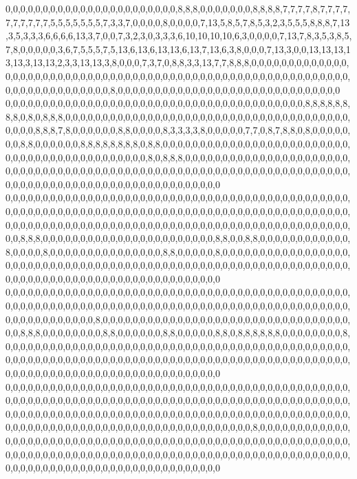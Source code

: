 0,0,0,0,0,0,0,0,0,0,0,0,0,0,0,0,0,0,0,0,0,0,0,8,8,8,0,0,0,0,0,0,0,8,8,8,8,7,7,7,7,8,7,7,7,7,7,7,7,7,7,7,5,5,5,5,5,5,5,7,3,3,7,0,0,0,0,8,0,0,0,0,7,13,5,8,5,7,8,5,3,2,3,5,5,5,8,8,8,7,13,3,5,3,3,3,6,6,6,6,13,3,7,0,0,7,3,2,3,0,3,3,3,6,10,10,10,10,6,3,0,0,0,0,7,13,7,8,3,5,3,8,5,7,8,0,0,0,0,0,3,6,7,5,5,5,7,5,13,6,13,6,13,13,6,13,7,13,6,3,8,0,0,0,7,13,3,0,0,13,13,13,13,13,3,13,13,2,3,3,13,13,3,8,0,0,0,7,3,7,0,8,8,3,3,13,7,7,8,8,8,0,0,0,0,0,0,0,0,0,0,0,0,0,0,0,0,0,0,0,0,0,0,0,0,0,0,0,0,0,0,0,0,0,0,0,0,0,0,0,0,0,0,0,0,0,0,0,0,0,0,0,0,0,0,0,0,0,0,0,0,0,0,0,0,0,0,0,0,0,0,0,0,0,8,0,0,0,0,0,0,0,0,0,0,0,0,0,0,0,0,0,0,0,0,0,0,0,0,0,0,0,0,0,0
0,0,0,0,0,0,0,0,0,0,0,0,0,0,0,0,0,0,0,0,0,0,0,0,0,0,0,0,0,0,0,0,0,0,0,0,0,0,0,0,8,8,8,8,8,8,8,8,0,8,0,8,8,8,0,0,0,0,0,0,0,0,0,0,0,0,0,0,0,0,0,0,0,0,0,0,0,0,0,0,0,0,0,0,0,0,0,0,0,0,0,0,0,0,0,0,8,8,8,7,8,0,0,0,0,0,0,8,8,0,0,0,0,8,3,3,3,3,8,0,0,0,0,0,7,7,0,8,7,8,8,0,8,0,0,0,0,0,0,0,8,8,0,0,0,0,0,0,8,8,8,8,8,8,8,8,0,8,8,0,0,0,0,0,0,0,0,0,0,0,0,0,0,0,0,0,0,0,0,0,0,0,0,0,0,0,0,0,0,0,0,0,0,0,0,0,0,0,0,0,0,0,0,8,0,8,8,8,0,0,0,0,0,0,0,0,0,0,0,0,0,0,0,0,0,0,0,0,0,0,0,0,0,0,0,0,0,0,0,0,0,0,0,0,0,0,0,0,0,0,0,0,0,0,0,0,0,0,0,0,0,0,0,0,0,0,0,0,0,0,0,0,0,0,0,0,0,0,0,0,0,0,0,0,0,0,0,0,0,0,0,0,0,0,0,0,0,0,0,0,0,0,0,0,0
0,0,0,0,0,0,0,0,0,0,0,0,0,0,0,0,0,0,0,0,0,0,0,0,0,0,0,0,0,0,0,0,0,0,0,0,0,0,0,0,0,0,0,0,0,0,0,0,0,0,0,0,0,0,0,0,0,0,0,0,0,0,0,0,0,0,0,0,0,0,0,0,0,0,0,0,0,0,0,0,0,0,0,0,0,0,0,0,0,0,0,0,0,0,0,0,0,0,0,0,0,0,0,0,0,0,0,0,0,0,0,0,0,0,0,0,0,0,0,0,0,0,0,0,0,0,0,0,0,0,0,0,0,0,0,0,0,0,0,0,8,8,8,0,0,0,0,0,0,0,0,0,0,0,0,0,0,0,0,0,0,0,0,0,0,0,8,8,0,0,8,8,0,0,0,0,0,0,0,0,0,0,0,0,8,0,0,0,0,8,0,0,0,0,0,0,0,0,0,0,0,0,0,0,0,8,8,0,0,0,0,0,8,0,0,0,0,0,0,0,0,0,0,0,0,0,0,0,0,0,0,0,0,0,0,0,0,0,0,0,0,0,0,0,0,0,0,0,0,0,0,0,0,0,0,0,0,0,0,0,0,0,0,0,0,0,0,0,0,0,0,0,0,0,0,0,0,0,0,0,0,0,0,0,0,0,0,0,0,0,0,0,0,0,0,0,0,0,0,0,0,0,0,0,0
0,0,0,0,0,0,0,0,0,0,0,0,0,0,0,0,0,0,0,0,0,0,0,0,0,0,0,0,0,0,0,0,0,0,0,0,0,0,0,0,0,0,0,0,0,0,0,0,0,0,0,0,0,0,0,0,0,0,0,0,0,0,0,0,0,0,0,0,0,0,0,0,0,0,0,0,0,0,0,0,0,0,0,0,0,0,0,0,0,0,0,0,0,0,0,0,0,0,0,0,0,0,0,0,8,0,0,0,0,0,0,0,0,0,0,0,0,0,0,0,0,0,0,0,0,0,0,0,0,0,0,0,0,0,0,0,0,0,0,0,8,8,8,0,0,0,0,0,0,0,0,8,8,0,0,0,0,0,0,8,8,0,0,0,0,0,8,8,0,8,8,8,8,8,8,0,0,0,0,0,0,0,0,8,0,0,0,0,0,0,0,0,0,0,0,0,0,0,0,0,0,0,0,0,0,0,0,0,0,0,0,0,0,0,0,0,0,0,0,0,0,0,0,0,0,0,0,0,0,0,0,0,0,0,0,0,0,0,0,0,0,0,0,0,0,0,0,0,0,0,0,0,0,0,0,0,0,0,0,0,0,0,0,0,0,0,0,0,0,0,0,0,0,0,0,0,0,0,0,0,0,0,0,0,0,0,0,0,0,0,0,0,0,0,0,0,0,0,0,0,0,0,0,0,0
0,0,0,0,0,0,0,0,0,0,0,0,0,0,0,0,0,0,0,0,0,0,0,0,0,0,0,0,0,0,0,0,0,0,0,0,0,0,0,0,0,0,0,0,0,0,0,0,0,0,0,0,0,0,0,0,0,0,0,0,0,0,0,0,0,0,0,0,0,0,0,0,0,0,0,0,0,0,0,0,0,0,0,0,0,0,0,0,0,0,0,0,0,0,0,0,0,0,0,0,0,0,0,0,0,0,0,0,0,0,0,0,0,0,0,0,0,0,0,0,0,0,0,0,0,0,0,0,0,0,0,0,0,0,0,0,0,0,0,0,0,0,0,0,0,0,0,0,0,0,0,0,0,0,0,0,0,0,0,0,0,0,0,0,0,0,0,0,0,0,0,8,0,0,0,0,0,0,0,0,0,0,0,0,0,0,0,0,0,0,0,0,0,0,0,0,0,0,0,0,0,0,0,0,0,0,0,0,0,0,0,0,0,0,0,0,0,0,0,0,0,0,0,0,0,0,0,0,0,0,0,0,0,0,0,0,0,0,0,0,0,0,0,0,0,0,0,0,0,0,0,0,0,0,0,0,0,0,0,0,0,0,0,0,0,0,0,0,0,0,0,0,0,0,0,0,0,0,0,0,0,0,0,0,0,0,0,0,0,0,0,0,0,0,0,0,0,0,0,0,0,0,0,0,0
